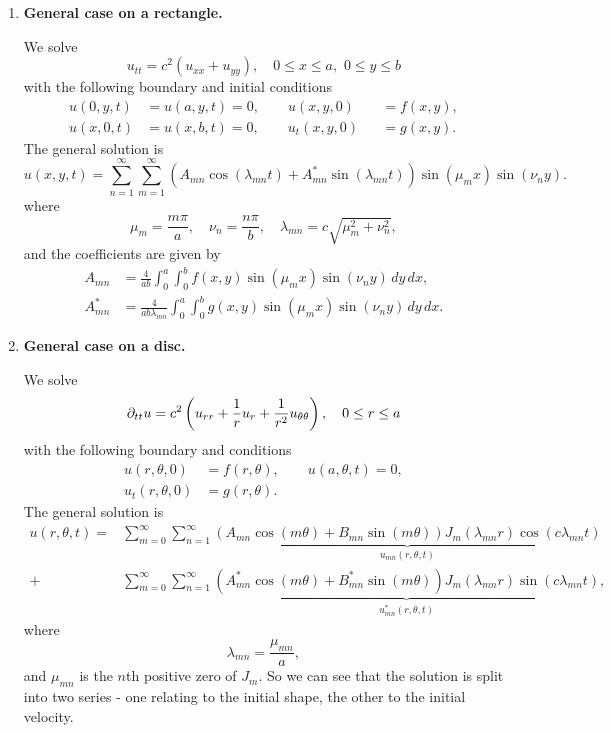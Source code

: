 \begin{enumerate}
	\item \textbf{General case on a rectangle.}
	
	We solve
	\[
	u_{tt} = c^2(u_{xx} + u_{yy}), \quad 0 \leq x \leq a, \,\, 0 \leq y \leq b
	\]
	with the following boundary and initial conditions
	\begin{equation*}
		\begin{alignedat}{2}
			u(0,y,t) &= u(a,y,t) = 0, \qquad u(x,y,0) &&= f(x,y), \\
			u(x,0,t) &= u(x,b,t) = 0, \qquad u_t(x,y,0) &&= g(x,y).
		\end{alignedat}
	\end{equation*}
	The general solution is
	\[
	u(x,y,t) = \sum_{n=1}^{\infty} \sum_{m=1}^{\infty} \left(A_{mn}\cos(\lambda_{mn}t) + A_{mn}^*\sin(\lambda_{mn}t) \right) \sin(\mu_m x) \sin(\nu_n y).
	\]
	where
	\[
	\mu_m = \frac{m\pi}{a}, \quad \nu_n = \frac{n\pi}{b}, \quad \lambda_{mn} = c\sqrt{\mu_m^2 + \nu_n^2},
	\]
	and the coefficients are given by
	\begin{align*}
		A_{mn} &= \frac{4}{ab} \int_0^a \int_0^b f(x,y) \sin(\mu_m x) \sin(\nu_n y) \,dy\,dx, \\
		A_{mn}^* &= \frac{4}{ab\lambda_{mn}} \int_0^a \int_0^b g(x,y) \sin(\mu_m x) \sin(\nu_n y) \,dy\,dx.
	\end{align*}
	
	\item \textbf{General case on a disc.}
	
	We solve
	\[
	\partial_{tt}u = c^2\left(u_{rr} + \frac{1}{r}u_r + \frac{1}{r^2}u_{\theta\theta}\right), \quad 0 \leq r \leq a
	\]
	with the following boundary and conditions
	\begin{align*}
		u(r,\theta,0) &= f(r,\theta), \qquad u(a,\theta,t) = 0, \\
		u_t(r,\theta,0) &= g(r,\theta).
	\end{align*}
	The general solution is
	\begin{align*}
		u(r,\theta,t) = &\sum_{m=0}^{\infty} \sum_{n=1}^{\infty} \underbrace{\left(A_{mn}\cos(m\theta) + B_{mn}\sin(m\theta)\right) J_m(\lambda_{mn}r) \cos(c\lambda_{mn}t)}_{u_{mn}(r,\theta,t)} \\
		+ &\sum_{m=0}^{\infty} \sum_{n=1}^{\infty} \underbrace{\left(A_{mn}^*\cos(m\theta) + B_{mn}^*\sin(m\theta)\right) J_m(\lambda_{mn}r) \sin(c\lambda_{mn}t)}_{u_{mn}^*(r,\theta,t)},
	\end{align*}
	where
	\[
	\lambda_{mn} = \frac{\mu_{mn}}{a},
	\]
	and $\mu_{mn}$ is the $n$th positive zero of $J_m$. So we can see that the solution is split into two series - one relating to the initial shape, the other to the initial velocity.
	

\end{enumerate}
